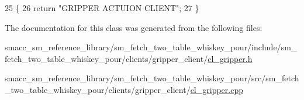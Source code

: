 \begin{DoxyCode}
25 \{
26     \textcolor{keywordflow}{return} \textcolor{stringliteral}{"GRIPPER ACTUION CLIENT"};
27 \}
\end{DoxyCode}


The documentation for this class was generated from the following files\+:\begin{DoxyCompactItemize}
\item 
smacc\+\_\+sm\+\_\+reference\+\_\+library/sm\+\_\+fetch\+\_\+two\+\_\+table\+\_\+whiskey\+\_\+pour/include/sm\+\_\+fetch\+\_\+two\+\_\+table\+\_\+whiskey\+\_\+pour/clients/gripper\+\_\+client/\hyperlink{sm__fetch__two__table__whiskey__pour_2include_2sm__fetch__two__table__whiskey__pour_2clients_2gripper__client_2cl__gripper_8h}{cl\+\_\+gripper.\+h}\item 
smacc\+\_\+sm\+\_\+reference\+\_\+library/sm\+\_\+fetch\+\_\+two\+\_\+table\+\_\+whiskey\+\_\+pour/src/sm\+\_\+fetch\+\_\+two\+\_\+table\+\_\+whiskey\+\_\+pour/clients/gripper\+\_\+client/\hyperlink{sm__fetch__two__table__whiskey__pour_2src_2sm__fetch__two__table__whiskey__pour_2clients_2gripper__client_2cl__gripper_8cpp}{cl\+\_\+gripper.\+cpp}\end{DoxyCompactItemize}
